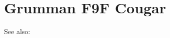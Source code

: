 \section{Grumman F9F Cougar}

\begin{adclist}
\end{adclist}

See also:
\begin{typelist}
\end{typelist}